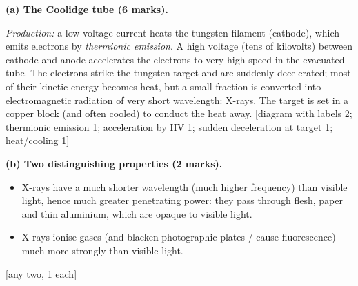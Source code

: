 \documentclass[11pt]{article}
\newcommand{\legende}[1]{\par\vspace{6pt}{\popsemi\fontsize{9}{11.5}\selectfont\color{popmuted}#1}}
\begin{document}
\begin{corrige}
\textbf{(a) The Coolidge tube (6 marks).}
\begin{center}
\legende{Coolidge X-ray tube}
\end{center}
\emph{Production:} a low-voltage current heats the tungsten filament (cathode), which emits electrons by \emph{thermionic emission}. A high voltage (tens of kilovolts) between cathode and anode accelerates the electrons to very high speed in the evacuated tube. The electrons strike the tungsten target and are suddenly decelerated; most of their kinetic energy becomes heat, but a small fraction is converted into electromagnetic radiation of very short wavelength: X-rays. The target is set in a copper block (and often cooled) to conduct the heat away. \hfill [diagram with labels 2; thermionic emission 1; acceleration by HV 1; sudden deceleration at target 1; heat/cooling 1]

\textbf{(b) Two distinguishing properties (2 marks).}
\begin{itemize}
\item X-rays have a much shorter wavelength (much higher frequency) than visible light, hence much greater penetrating power: they pass through flesh, paper and thin aluminium, which are opaque to visible light.
\item X-rays ionise gases (and blacken photographic plates / cause fluorescence) much more strongly than visible light.
\end{itemize}
\hfill [any two, 1 each]


\end{corrige}
\end{document}

